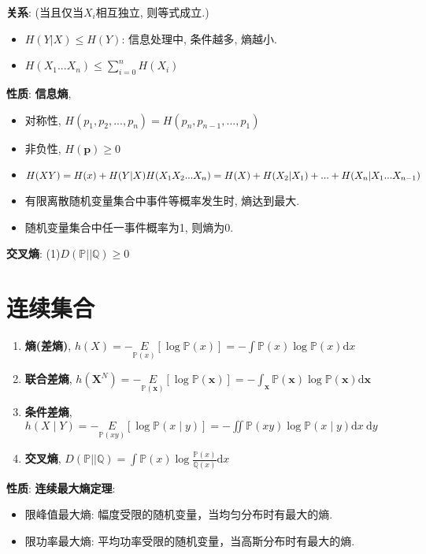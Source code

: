 \documentclass{article}
\newcommand{\env}[2]{\begin{#1}#2\end{#1}}
\newcommand{\defi}[2]{\textbf{#1}, #2}
\begin{document}
                \textbf{关系}: (当且仅当$X_i$相互独立, 则等式成立.)
                \env{itemize}{
                    \item $H(Y|X) \le H(Y)$: 信息处理中, 条件越多, 熵越小.
                    \item $H(X_1...X_n) \le \sum\limits_{i=0}^n H(X_i)$
                }
                
                \textbf{性质}: \textbf{信息熵}, 
                    \env{itemize}{
                        \item 对称性, $H(p_1, p_2, ..., p_n) = H(p_n, p_{n-1}, ..., p_1)$
                        \item 非负性, $H(\boldsymbol p) \ge 0$
                        \item $H(XY) = H(x) + H(Y|X) \\ H(X_1 X_2 ... X_n) = H(X) + H(X_2|X_1) + ... + H(X_n|X_1...X_{n-1})$
                        \item 有限离散随机变量集合中事件等概率发生时, 熵达到最大.
                        \item 随机变量集合中任一事件概率为1, 则熵为0.
                    } 
                    \textbf{交叉熵}: (1)$D(\mathbb P || \mathbb Q) \ge 0$

            \section{连续集合}
                \env{enumerate}{
                    \item \defi{熵(差熵)}{$h(X)=-\underset{\mathbb P(x)}{E}[\log \mathbb P(x)]=-\int \mathbb P(x) \log \mathbb P(x) \mathrm{d} x$}
                    \item \defi{联合差熵}{$h\left(\boldsymbol{X}^{N}\right)=-\underset{\mathbb P(\boldsymbol{x})}{E}[\log \mathbb P(\boldsymbol{x})]=-\int_{\boldsymbol{x}} \mathbb P(\boldsymbol{x}) \log \mathbb P(\boldsymbol{x}) \mathrm{d} \boldsymbol{x}$}
                    \item \defi{条件差熵}{$h(X \mid Y)=-\underset{\mathbb P(x y)}{E}[\log \mathbb P(x \mid y)]=-\iint \mathbb P(x y) \log \mathbb P(x \mid y) \mathrm{d} x \mathrm{~d} y$}
                    \item \defi{交叉熵}{$D(\mathbb P || \mathbb Q)=\int \mathbb P(x) \log \frac{\mathbb P(x)}{\mathbb Q(x)} \mathrm{d} x$}
                }
                
                \textbf{性质}: \textbf{连续最大熵定理}:
                    \env{itemize}{
                        \item 限峰值最大熵: 幅度受限的随机变量，当均匀分布时有最大的熵.
                        \item 限功率最大熵: 平均功率受限的随机变量，当高斯分布时有最大的熵.
                    }
                
\end{document}
